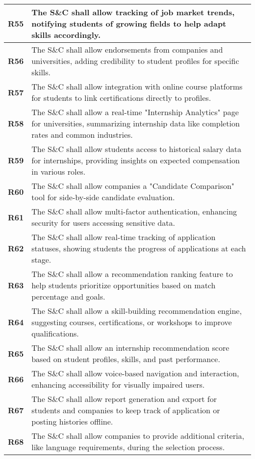 \begin{longtable}{|p{}|p{}|}
\hline
\textbf{R55} & The S\&C shall allow tracking of job market trends, notifying students of growing fields to help adapt skills accordingly. \\ 
\hline
\textbf{R56} & The S\&C shall allow endorsements from companies and universities, adding credibility to student profiles for specific skills. \\ 
\hline
\textbf{R57} & The S\&C shall allow integration with online course platforms for students to link certifications directly to profiles. \\ 
\hline
\textbf{R58} & The S\&C shall allow a real-time "Internship Analytics" page for universities, summarizing internship data like completion rates and common industries. \\ 
\hline
\textbf{R59} & The S\&C shall allow students access to historical salary data for internships, providing insights on expected compensation in various roles. \\ 
\hline
\textbf{R60} & The S\&C shall allow companies a "Candidate Comparison" tool for side-by-side candidate evaluation. \\ 
\hline
\textbf{R61} & The S\&C shall allow multi-factor authentication, enhancing security for users accessing sensitive data. \\ 
\hline
\textbf{R62} & The S\&C shall allow real-time tracking of application statuses, showing students the progress of applications at each stage. \\ 
\hline
\textbf{R63} & The S\&C shall allow a recommendation ranking feature to help students prioritize opportunities based on match percentage and goals. \\ 
\hline
\textbf{R64} & The S\&C shall allow a skill-building recommendation engine, suggesting courses, certifications, or workshops to improve qualifications. \\ 
\hline
\textbf{R65} & The S\&C shall allow an internship recommendation score based on student profiles, skills, and past performance. \\ 
\hline
\textbf{R66} & The S\&C shall allow voice-based navigation and interaction, enhancing accessibility for visually impaired users. \\ 
\hline
\textbf{R67} & The S\&C shall allow report generation and export for students and companies to keep track of application or posting histories offline. \\ 
\hline
\textbf{R68} & The S\&C shall allow companies to provide additional criteria, like language requirements, during the selection process. \\ 

\end{longtable}
